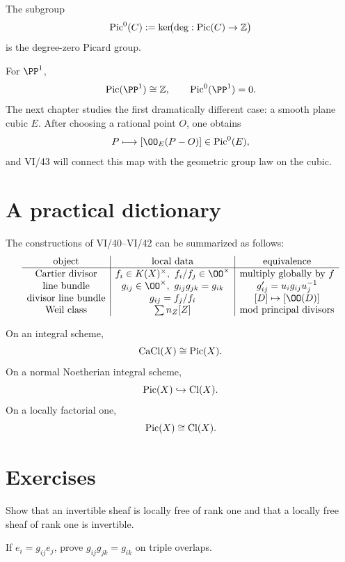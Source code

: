 \begin{definition}\label{def:vi42-pic-zero}
The subgroup
\[
  \operatorname{Pic}^0(C)
  :=
  \ker\!\bigl(\deg:\operatorname{Pic}(C)\to\mathbb Z\bigr)
\]
is the degree-zero Picard group.
\end{definition}

For \(\PP^1\),
\[
  \Pic(\PP^1)\cong\mathbb Z,
  \qquad
  \Pic^0(\PP^1)=0.
\]
The next chapter studies the first dramatically different case: a smooth plane cubic \(E\).  After choosing a rational point \(O\), one obtains
\[
  P\longmapsto[\OO_E(P-O)]\in\Pic^0(E),
\]
and VI/43 will connect this map with the geometric group law on the cubic.



\section{A practical dictionary}

The constructions of VI/40--VI/42 can be summarized as follows:
\[
\begin{array}{c|c|c}
\text{object} & \text{local data} & \text{equivalence}\\
\hline
\text{Cartier divisor} & f_i\in K(X)^\times,\ f_i/f_j\in\OO^\times & \text{multiply globally by }f\\
\text{line bundle} & g_{ij}\in\OO^\times,\ g_{ij}g_{jk}=g_{ik} & g'_{ij}=u_i g_{ij}u_j^{-1}\\
\text{divisor line bundle} & g_{ij}=f_j/f_i & [D]\mapsto[\OO(D)]\\
\text{Weil class} & \sum n_Z[Z] & \text{mod principal divisors}
\end{array}
\]

On an integral scheme,
\[
  \operatorname{CaCl}(X)\cong\operatorname{Pic}(X).
\]
On a normal Noetherian integral scheme,
\[
  \operatorname{Pic}(X)\hookrightarrow\operatorname{Cl}(X).
\]
On a locally factorial one,
\[
  \operatorname{Pic}(X)\cong\operatorname{Cl}(X).
\]

\section{Exercises}

\begin{exercise}\label{exr:vi42-01}
Show that an invertible sheaf is locally free of rank one and that a locally free sheaf of rank one is invertible.
\end{exercise}

\begin{exercise}\label{exr:vi42-02}
If \(e_i=g_{ij}e_j\), prove \(g_{ij}g_{jk}=g_{ik}\) on triple overlaps.
\end{exercise}

